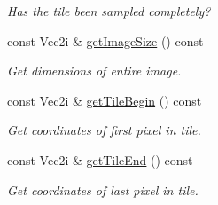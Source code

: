 \begin{DoxyCompactItemize}
\begin{DoxyCompactList}\small\item\em Has the tile been sampled completely? \item\end{DoxyCompactList}\item 
const Vec2i \& \hyperlink{classembree_1_1_sampler_a322ebd7692889c02eccd26a967a0a46b}{getImageSize} () const 
\begin{DoxyCompactList}\small\item\em Get dimensions of entire image. \item\end{DoxyCompactList}\item 
const Vec2i \& \hyperlink{classembree_1_1_sampler_ab4791f27b649933c0b73c46ef4518fe7}{getTileBegin} () const 
\begin{DoxyCompactList}\small\item\em Get coordinates of first pixel in tile. \item\end{DoxyCompactList}\item 
const Vec2i \& \hyperlink{classembree_1_1_sampler_a3d1423396ba037139211a84325d0cd40}{getTileEnd} () const 
\begin{DoxyCompactList}\small\item\em Get coordinates of last pixel in tile. \item\end{DoxyCompactList}\end{DoxyCompactItemize}

